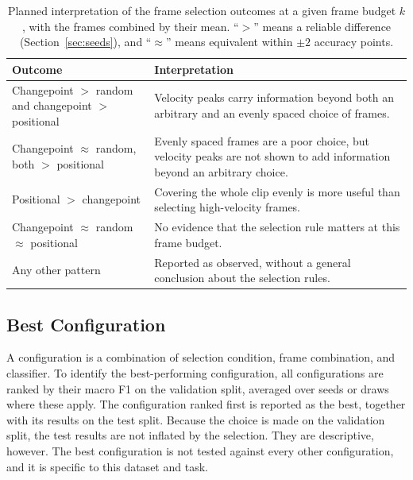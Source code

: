 \begin{table}[t]
   \centering
   \caption[Planned interpretation of outcomes]{Planned interpretation of the frame selection outcomes at a given frame budget $k$, with the frames combined by their mean. ``$>$'' means a reliable difference (Section~\ref{sec:seeds}), and ``$\approx$'' means equivalent within $\pm 2$ accuracy points.}
   \label{tab:interpretation}
   \begin{tabular}{L{4.3cm}L{9.2cm}}
      \toprule
      Outcome & Interpretation \\
      \midrule
      Changepoint $>$ random and changepoint $>$ positional & Velocity peaks carry information beyond both an arbitrary and an evenly spaced choice of frames. \\
      Changepoint $\approx$ random, both $>$ positional & Evenly spaced frames are a poor choice, but velocity peaks are not shown to add information beyond an arbitrary choice. \\
      Positional $>$ changepoint & Covering the whole clip evenly is more useful than selecting high-velocity frames. \\
      Changepoint $\approx$ random $\approx$ positional & No evidence that the selection rule matters at this frame budget. \\
      Any other pattern & Reported as observed, without a general conclusion about the selection rules. \\
      \bottomrule
   \end{tabular}
\end{table}

\subsection{Best Configuration}
\label{sec:bestconfig}

A configuration is a combination of selection condition, frame combination, and classifier. To identify the best-performing configuration, all configurations are ranked by their macro F1 on the validation split, averaged over seeds or draws where these apply. The configuration ranked first is reported as the best, together with its results on the test split. Because the choice is made on the validation split, the test results are not inflated by the selection. They are descriptive, however. The best configuration is not tested against every other configuration, and it is specific to this dataset and task.



